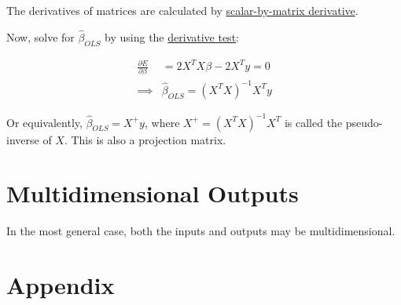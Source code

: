 \documentclass[12pt,a4paper]{article}
\begin{document}
The derivatives of matrices are calculated by
\href{https://en.wikipedia.org/wiki/Matrix_calculus\#Scalar-by-matrix}{scalar-by-matrix
derivative}.

Now, solve for \(\hat\beta_{OLS}\) by using the
\href{https://en.wikipedia.org/wiki/Derivative_test}{derivative test}:

\begin{align}\frac{\partial E}{\partial \beta} &= 2 X^TX \beta-2X^Ty=0\\\implies&\hat\beta_{OLS}=(X^TX)^{-1}X^Ty\end{align}

Or equivalently, \(\hat\beta_{OLS}=X^+y\), where \(X^+=(X^TX)^{-1}X^T\)
is called the pseudo-inverse of \(X\). This is also a projection matrix.

\section{Multidimensional Outputs}

In the most general case, both the inputs and outputs may be
multidimensional.

\section{Appendix}
\end{document}
